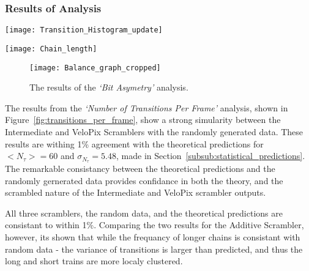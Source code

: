 		\subsubsection{Results of Analysis}
		\label{subsub:algorithm_results}
			\begin{SCfigure}%
				\centering
				\texttt{[image: Transition\_Histogram\_update]}
				\caption{Results of the \textit{`Number of Transitions Per Frame'} analysis. The results for the Random Data, Intermediate Scrambler and VeloPix Scrambler overlap for the \textit{`Number of Transitions Per Frame'} analysis.}
				\label{fig:transitions_per_frame}
			\end{SCfigure}
			\par
			\begin{SCfigure}%
				\centering
				\texttt{[image: Chain\_length]}
				\caption{Results of the \textit{`Common Bit Chain Length'} analysis. The results for the Random Data, Additive Scrambler, Intermediate Scrambler and VeloPix Scrambler approximatly overlap for the \textit{`Common Bit Chain Length'} analysis.}
				\label{fig:chain_length}
			\end{SCfigure}
			\par
			\begin{figure}[ht]
				\centering
				\texttt{[image: Balance\_graph\_cropped]}
				\caption{The results of the \textit{`Bit Asymetry'} analysis.}
				\label{fig:bit_asym}
			\end{figure}

			The results from the \textit{`Number of Transitions Per Frame'} analysis, shown in Figure~\ref{fig:transitions_per_frame}, show a strong simularity between the Intermediate and VeloPix Scramblers with the randomly generated data. 
			These results are withing 1\% agreement with the theoretical predictions for $<N_\tau> = 60$ and $\sigma_{N_\tau} = 5.48$, made in Section~\ref{subsub:statistical_predictions}. 
			The remarkable consistancy between the theoretical predictions and the randomly gernerated data provides confidance in both the theory, and the scrambled nature of the Intermediate and VeloPix scrambler outputs.
			
			All three scramblers, the random data, and the theoretical predictions are consistant to within 1\%. 
			Comparing the two results for the Additive Scrambler, however, its shown that while the frequancy of longer chains is consistant with random data - the variance of transitions is larger than predicted, and thus the long and short trains are more localy clustered. 
			
